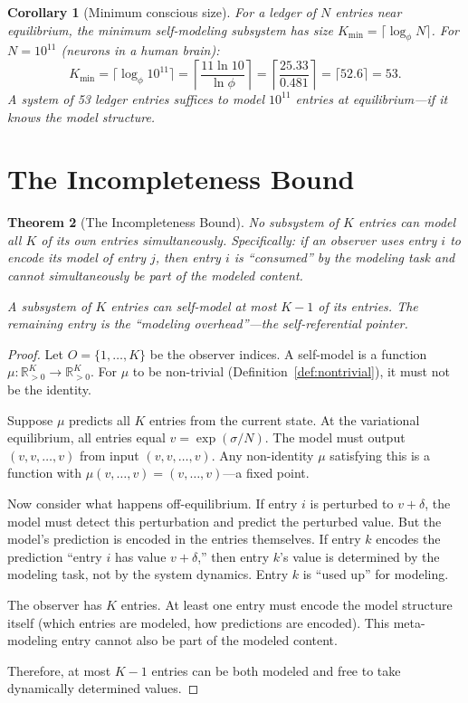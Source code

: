 \documentclass[11pt,a4paper]{article}
\theoremstyle{plain}
\newtheorem{theorem}{Theorem}[section]
\newtheorem{corollary}[theorem]{Corollary}
\theoremstyle{definition}
\theoremstyle{remark}
\newcommand{\Rp}{\mathbb{R}_{>0}}
\begin{document}
\begin{corollary}[Minimum conscious size]
For a ledger of $N$ entries near equilibrium, the minimum self-modeling
subsystem has size $K_{\min} = \lceil\log_\phi N\rceil$.  For
$N = 10^{11}$ (neurons in a human brain):
\[
  K_{\min} = \lceil\log_\phi 10^{11}\rceil
  = \left\lceil\frac{11 \ln 10}{\ln \phi}\right\rceil
  = \left\lceil\frac{25.33}{0.481}\right\rceil
  = \lceil 52.6\rceil = 53.
\]
A system of 53 ledger entries suffices to model $10^{11}$ entries at
equilibrium---if it knows the model structure.
\end{corollary}

\section{The Incompleteness Bound}
\label{sec:incompleteness}

\begin{theorem}[The Incompleteness Bound]
\label{thm:incompleteness}
No subsystem of $K$ entries can model all $K$ of its own entries
simultaneously.  Specifically: if an observer uses entry $i$ to encode
its model of entry $j$, then entry $i$ is ``consumed'' by the modeling
task and cannot simultaneously be part of the modeled content.

A subsystem of $K$ entries can self-model at most $K - 1$ of its entries.
The remaining entry is the ``modeling overhead''---the
self-referential pointer.
\end{theorem}

\begin{proof}
Let $O = \{1, \ldots, K\}$ be the observer indices.  A self-model is a
function $\mu : \Rp^K \to \Rp^K$.  For $\mu$ to be non-trivial
(Definition~\ref{def:nontrivial}), it must not be the identity.

Suppose $\mu$ predicts all $K$ entries from the current state.  At the
variational equilibrium, all entries equal $v = \exp(\sigma/N)$.  The
model must output $(v, v, \ldots, v)$ from input $(v, v, \ldots, v)$.
Any non-identity $\mu$ satisfying this is a function with
$\mu(v, \ldots, v) = (v, \ldots, v)$---a fixed point.

Now consider what happens off-equilibrium.  If entry $i$ is perturbed
to $v + \delta$, the model must detect this perturbation and predict
the perturbed value.  But the model's prediction is encoded in the
entries themselves.  If entry $k$ encodes the prediction ``entry $i$
has value $v + \delta$,'' then entry $k$'s value is determined by the
modeling task, not by the system dynamics.  Entry $k$ is ``used up''
for modeling.

The observer has $K$ entries.  At least one entry must encode the model
structure itself (which entries are modeled, how predictions are
encoded).  This meta-modeling entry cannot also be part of the modeled
content.

Therefore, at most $K - 1$ entries can be both modeled and free to take
dynamically determined values.
\end{proof}
\end{document}
